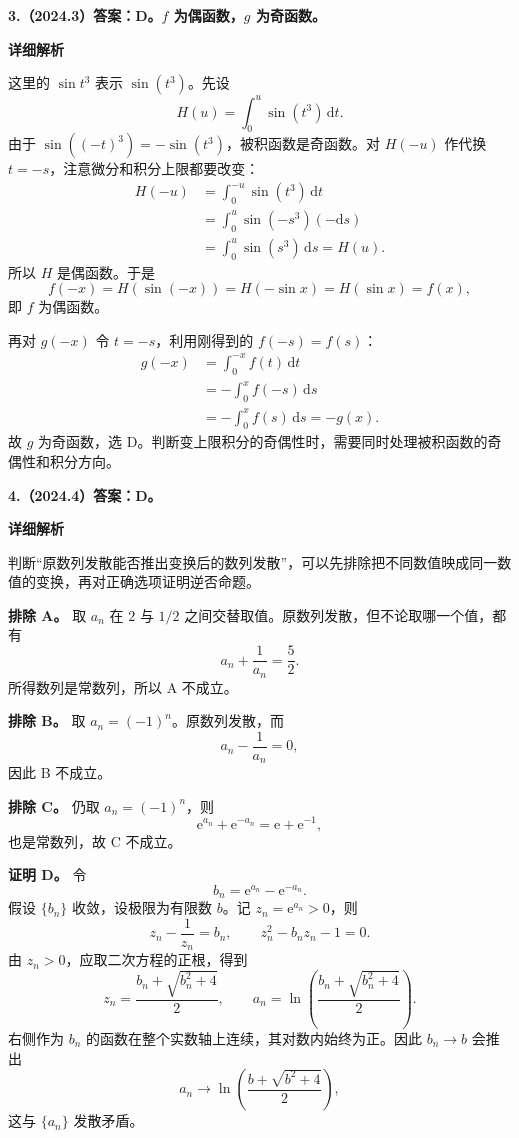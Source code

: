 \documentclass[UTF8,11pt,fontset=windows]{ctexart}
\begin{document}
\clearpage

\textbf{3.（2024.3）答案：D。$f$ 为偶函数，$g$ 为奇函数。}

\textbf{详细解析}

这里的 $\sin t^3$ 表示 $\sin(t^3)$。先设
$$
H(u)=\int_0^u\sin(t^3)\,\mathrm dt.
$$
由于 $\sin((-t)^3)=-\sin(t^3)$，被积函数是奇函数。对 $H(-u)$ 作代换 $t=-s$，注意微分和积分上限都要改变：
$$
\begin{aligned}
H(-u)
&=\int_0^{-u}\sin(t^3)\,\mathrm dt\\
&=\int_0^u\sin(-s^3)(-\mathrm ds)\\
&=\int_0^u\sin(s^3)\,\mathrm ds=H(u).
\end{aligned}
$$
所以 $H$ 是偶函数。于是
$$
f(-x)=H(\sin(-x))=H(-\sin x)=H(\sin x)=f(x),
$$
即 $f$ 为偶函数。

再对 $g(-x)$ 令 $t=-s$，利用刚得到的 $f(-s)=f(s)$：
$$
\begin{aligned}
g(-x)
&=\int_0^{-x}f(t)\,\mathrm dt\\
&=-\int_0^x f(-s)\,\mathrm ds\\
&=-\int_0^x f(s)\,\mathrm ds=-g(x).
\end{aligned}
$$
故 $g$ 为奇函数，选 D。判断变上限积分的奇偶性时，需要同时处理被积函数的奇偶性和积分方向。

\clearpage

\textbf{4.（2024.4）答案：D。}

\textbf{详细解析}

判断“原数列发散能否推出变换后的数列发散”，可以先排除把不同数值映成同一数值的变换，再对正确选项证明逆否命题。

\textbf{排除 A。} 取 $a_n$ 在 $2$ 与 $1/2$ 之间交替取值。原数列发散，但不论取哪一个值，都有
$$
a_n+\frac1{a_n}=\frac52.
$$
所得数列是常数列，所以 A 不成立。

\textbf{排除 B。} 取 $a_n=(-1)^n$。原数列发散，而
$$
a_n-\frac1{a_n}=0,
$$
因此 B 不成立。

\textbf{排除 C。} 仍取 $a_n=(-1)^n$，则
$$
\mathrm e^{a_n}+\mathrm e^{-a_n}=\mathrm e+\mathrm e^{-1},
$$
也是常数列，故 C 不成立。

\textbf{证明 D。} 令
$$
b_n=\mathrm e^{a_n}-\mathrm e^{-a_n}.
$$
假设 $\{b_n\}$ 收敛，设极限为有限数 $b$。记 $z_n=\mathrm e^{a_n}>0$，则
$$
z_n-\frac1{z_n}=b_n,
\qquad z_n^2-b_nz_n-1=0.
$$
由 $z_n>0$，应取二次方程的正根，得到
$$
z_n=\frac{b_n+\sqrt{b_n^2+4}}2,
\qquad
a_n=\ln\!\left(\frac{b_n+\sqrt{b_n^2+4}}2\right).
$$
右侧作为 $b_n$ 的函数在整个实数轴上连续，其对数内始终为正。因此 $b_n\to b$ 会推出
$$
a_n\longrightarrow
\ln\!\left(\frac{b+\sqrt{b^2+4}}2\right),
$$
这与 $\{a_n\}$ 发散矛盾。
\end{document}

